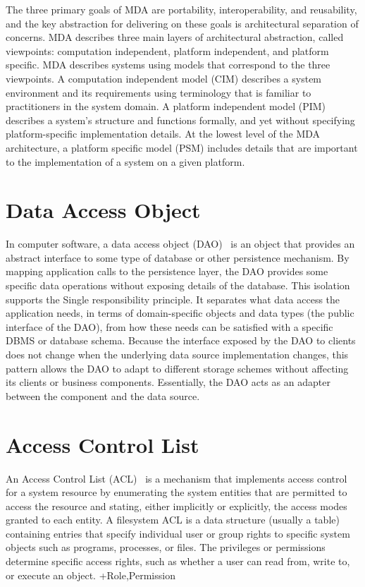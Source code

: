 	The three primary goals of MDA are portability, interoperability, and reusability, and the key abstraction for delivering on these goals is architectural separation of concerns. MDA describes three main layers of architectural abstraction, called viewpoints: computation independent, platform independent, and platform specific. MDA describes systems using models that correspond to the three viewpoints. A computation independent model (CIM) describes a system environment and its requirements using terminology that is familiar to practitioners in the system domain. A platform independent model (PIM) describes a system’s structure and functions formally, and yet without specifying platform-specific implementation details. At the lowest level of the MDA architecture, a platform specific model (PSM) includes details that are important to the implementation of a system on a given platform.


\section{Data Access Object}
\label{dao}
In computer software, a data access object (DAO)~\cite{DAO} is an object that provides an abstract interface to some type of database or other persistence mechanism. By mapping application calls to the persistence layer, the DAO provides some specific data operations without exposing details of the database. This isolation supports the Single responsibility principle. It separates what data access the application needs, in terms of domain-specific objects and data types (the public interface of the DAO), from how these needs can be satisfied with a specific DBMS or database schema. Because the interface exposed by the DAO to clients does not change when the underlying data source implementation changes, this pattern allows the DAO to adapt to different storage schemes without affecting its clients or business components. Essentially, the DAO acts as an adapter between the component and the data source.

\section{Access Control List}
\label{acl}
An Access Control List (ACL)~\cite{shirey2007internet} is a mechanism that implements access control for a system resource by enumerating the system 	entities that are permitted to access the resource and stating, either implicitly or explicitly, the access modes granted to each entity. A filesystem ACL is a data structure (usually a table) containing entries that specify individual user or group rights to specific system objects such as programs, processes, or files. The privileges or permissions determine specific access rights, such as whether a user can read from, write to, or execute an object. +Role,Permission

